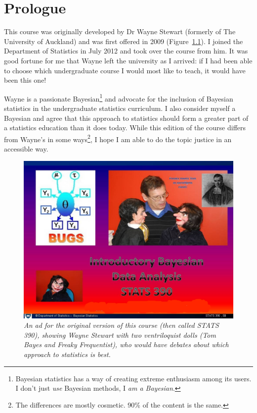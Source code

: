 \chapter{Prologue}
This course was originally developed by Dr Wayne Stewart (formerly of The
University of
Auckland) and was first offered in 2009 (Figure~\ref{fig:wayne}).
I joined the Department of Statistics in July 2012
and took over the course from him. It was good fortune for me that Wayne left
the university as I arrived: if I had been able to choose which undergraduate
course I would most like to teach, it would have been this one!

Wayne is a passionate Bayesian\footnote{Bayesian statistics has a way of
creating extreme enthusiasm among its users. I don't just {\it use} Bayesian
methods, I {\it am a Bayesian}.}
and advocate
for the inclusion of Bayesian statistics in the undergraduate
statistics curriculum. I also consider myself a Bayesian and agree that this
approach to statistics should form a greater part of a statistics education
than it does today. 
While this edition of the course differs from Wayne's in some ways\footnote{
The differences are mostly cosmetic. 90\% of the content is the same.},
I hope I am able to do the topic justice in an accessible way.

\begin{figure}[ht!]
\begin{center}
\includegraphics[scale=0.5]{Figures/390course.jpg}
\end{center}
\caption{\it An ad for the original version of this course (then called
STATS 390), showing Wayne Stewart with two ventriloquist dolls (Tom Bayes and
Freaky Frequentist), who would have debates about which approach to statistics
is best.\label{fig:wayne}}
\end{figure}

